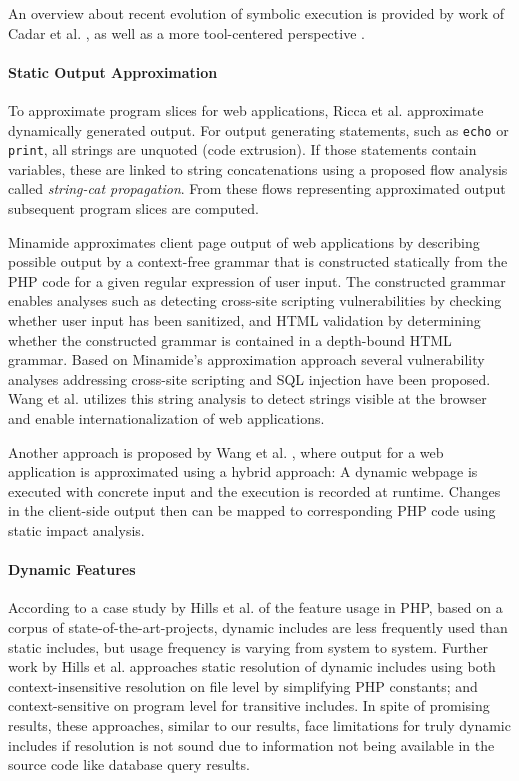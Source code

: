 \documentclass[sigconf]{acmart}
\renewcommand{\tt}[1]{\texttt{#1}}
\begin{document}
An overview about recent evolution of symbolic execution is provided by work of Cadar et al.
\cite{CadarSen2013}, as well as a more tool-centered perspective \cite{Cadar2011}.

\paragraph{Static Output Approximation}
To approximate program slices for web
applications, Ricca et al. \cite{tonella_web_2005,tonella_2001,tonella_2002} approximate
dynamically generated output. For output generating statements, such as \tt{echo} or
\tt{print}, all strings are unquoted (code extrusion). If those statements
contain variables, these are linked to string concatenations using a
proposed flow analysis called \emph{string-cat propagation}. From these
flows representing approximated output subsequent program slices are computed.

Minamide \cite{minamide_static_2005} approximates client page output
of web applications by describing possible output by a context-free
grammar that is constructed statically from the PHP code for a given regular
expression of user input. The constructed grammar enables analyses such as
detecting cross-site scripting vulnerabilities by checking whether user input
has been sanitized, and HTML validation by determining whether the constructed
grammar is contained in a depth-bound HTML grammar. Based on Minamide's
approximation approach several vulnerability analyses addressing cross-site
scripting \cite{wassermann_static_2008} and SQL injection
\cite{wassermann2007sound} have been proposed. Wang et al.
\cite{wang_locating_2010} utilizes this string analysis to detect strings
visible at the browser and enable internationalization of web applications.
    
Another approach is proposed by Wang et al. \cite{wang_automating_2012}, where
output for a web application is approximated using a hybrid approach: A
dynamic webpage is executed with concrete input and the execution is
recorded at runtime. Changes in the client-side output then can be mapped to 
corresponding PHP code using static impact analysis.

\paragraph{Dynamic Features}
According to a case study by Hills et al. \cite{Hills:2013:ESP:2483760.2483786}
of the feature usage in PHP, based on a corpus of state-of-the-art-projects,
dynamic includes are less frequently used than static includes, but usage
frequency is varying from system to system. Further work by Hills et al.
\cite{hills2014static,hills2014php} approaches static resolution of dynamic includes using
both context-insensitive resolution on file level by simplifying PHP constants; and context-sensitive on program level for transitive includes. In spite of
promising results, these approaches, similar to our results, face limitations
for truly dynamic includes if resolution is not sound due to information not
being available in the source code like database query results. 
\end{document}
